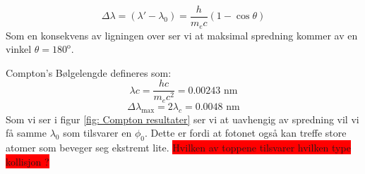 \[
Δ λ = ( λ' - λ_0) = \frac{h}{m_e c} (1 - \cos θ)
\]
Som en konsekvens av ligningen over ser vi at maksimal spredning kommer av en vinkel $θ = 180^{\text{o}}$. 

Compton's Bølgelengde defineres som:
\[
λc = \frac{hc}{m_e c^{2}} = 0.00243 \text{ nm}
\]
\[
Δ λ_{\text{max}} = 2 λ_c = 0.0048 \text{ nm}
\]
Som vi ser i figur \ref{fig: Compton resultater} ser vi at uavhengig av spredning vil vi få samme $λ_0$ som tilsvarer en $ϕ_0$. Dette er fordi at fotonet også kan treffe store atomer som beveger seg ekstremt lite. \colorbox{red}{Hvilken av toppene tilsvarer hvilken type kollisjon ?}